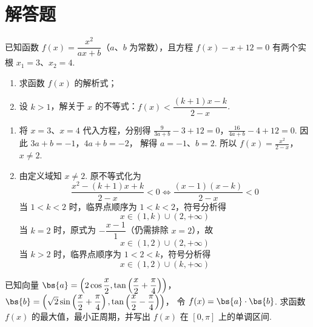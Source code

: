\section{解答题}
\begin{problem}
已知函数 \(f(x)=\dfrac{x^2}{ax+b}\)（\(a\)、\(b\) 为常数），且方程 \(f(x)-x+12=0\) 有两个实根 \(x_1=3\)、\(x_2=4\).

\begin{enumerate}
\item 求函数 \(f(x)\) 的解析式；
\item 设 \(k>1\)，解关于 \(x\) 的不等式：\(f(x)<\dfrac{(k+1)x-k}{2-x}\).
\end{enumerate}
\end{problem}

\begin{solution}
\begin{enumerate}
\item 将 \(x=3\)、\(x=4\) 代入方程，分别得
\(\frac9{3a+b}-3+12=0\)，\(\frac{16}{4a+b}-4+12=0\).
因此
\(3a+b=-1\)，\(4a+b=-2\)，
解得 \(a=-1\)、\(b=2\). 所以
\(f(x)=\frac{x^2}{2-x}\)，\(x\neq2\).

\item 由定义域知 \(x\neq2\). 原不等式化为
\[
\frac{x^2-(k+1)x+k}{2-x}<0
\Longleftrightarrow
\frac{(x-1)(x-k)}{2-x}<0
\]
当 \(1<k<2\) 时，临界点顺序为 \(1<k<2\)，符号分析得
\[
x\in(1,k)\cup(2,+\infty)
\]
当 \(k=2\) 时，原式为 \(-\dfrac{x-1}{1}\)（仍需排除 \(x=2\)），故
\[
x\in(1,2)\cup(2,+\infty)
\]
当 \(k>2\) 时，临界点顺序为 \(1<2<k\)，符号分析得
\[
x\in(1,2)\cup(k,+\infty)
\]
\end{enumerate}
\end{solution}

\begin{problem}
已知向量 \(\bs{a}=\left(2\cos\dfrac x2,\tan\left(\dfrac x2+\dfrac\pi4\right)\right)\)，\(\bs{b}=\left(\sqrt2\sin\left(\dfrac x2+\dfrac\pi4\right),\tan\left(\dfrac x2-\dfrac\pi4\right)\right)\)，
令 \(f(x)=\bs{a}\cdot\bs{b}\). 求函数 \(f(x)\) 的最大值，最小正周期，并写出 \(f(x)\) 在 \([0,\pi]\) 上的单调区间.
\end{problem}

